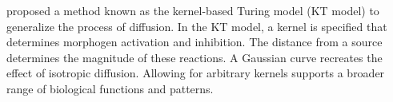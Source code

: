 \citet{kondo2017} proposed a method known as the kernel-based Turing model (KT model) to generalize the process of diffusion. In the KT model, a kernel is specified that determines morphogen activation and inhibition. The distance from a source determines the magnitude of these reactions. A Gaussian curve recreates the effect of isotropic diffusion. Allowing for arbitrary kernels supports a broader range of biological functions and patterns.